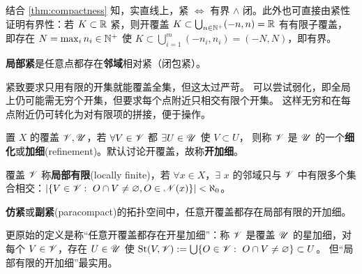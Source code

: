 \begin{example}
    结合 \ref{thm:compactness} 知，实直线上，紧 $\iff$ 有界 $\land$ 闭。此外也可直接由紧性证明有界性：若 $K\subset\mathbb{R}$ 紧，则开覆盖 $K\subset\bigcup_{n\in\mathbb{N}^+}(-n,n)=\mathbb{R}$ 有有限子覆盖，即存在 $N = \max_i{n_i}\in\mathbb{N}^+$ 使 $K\subset \bigcup_{i=1}^m(-n_i,n_i)=(-N,N)$，即有界。
\end{example}

\begin{definition}
    \textbf{局部紧}是任意点都存在\textbf{邻域}相对紧（闭包紧）。
\end{definition}

紧致要求只用有限的开集就能覆盖全集，但这太过严苛。
可以尝试弱化，即全局上仍可能需无穷个开集，但要求每个点附近只相交有限个开集。
这样无穷和在每点附近仍可转化为对有限项的拼接，便于操作。

\begin{definition}
置 $X$ 的覆盖 $\mathscr V,\mathscr U$，若 $\forall V\in\mathscr V$ 都 $\exists U\in\mathscr U$ 使 $V\subset U$，
则称 $\mathscr V$ 是 $\mathscr U$ 的一个\textbf{细化}或\textbf{加细}(refinement)。默认讨论开覆盖，故称\textbf{开加细}。
\end{definition}

\begin{definition}
覆盖 $\mathscr V$ 称\textbf{局部有限}(locally finite)，若 $\forall x\in X$，$\exists$ $x$ 的邻域只与 $\mathscr V$ 中有限多个集合相交：$|\{V\in\mathscr V:\ O\cap V\ne\varnothing, O\in\mathscr N(x)\}|<\aleph_0$。
\end{definition}


\begin{definition}
    \textbf{仿紧}或\textbf{副紧}(paracompact)的拓扑空间中，任意开覆盖都存在局部有限的开加细。
\end{definition}
\begin{remark}
    更原始的定义是称“任意开覆盖都存在开星加细”：称 $\mathscr V$ 是覆盖 $\mathscr U$ 的星加细，对每个 $V\in\mathscr V$，存在 $U\in\mathscr U$ 使 $\operatorname{St}(V,\mathscr V):=\bigcup\{O\in\mathscr V:\ O\cap V\ne\varnothing\}\subset U$。
    但“局部有限的开加细”最实用。
\end{remark}

